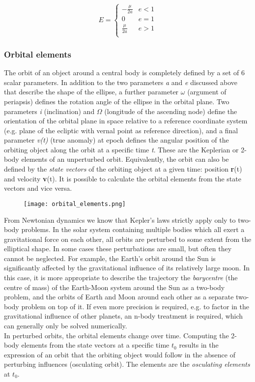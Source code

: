 \documentclass[Orbiter User Manual.tex]{subfiles}
\begin{document}
\[ E =
\left\{
\begin{array}{ll}
	-\frac{\mu}{2a} & e < 1 \\
	0 & e = 1 \\
	\frac{\mu}{2a} & e > 1 \\
\end{array} 
\right. \]

\subsubsection{Orbital elements}
The orbit of an object around a central body is completely defined by a set of 6 scalar parameters. In addition to the two parameters \textit{a} and \textit{e} discussed above that describe the shape of the ellipse, a further parameter $\omega$ (argument of periapsis) defines the rotation angle of the ellipse in the orbital plane. Two parameters \textit{i} (inclination) and $\Omega$ (longitude of the ascending node) define the orientation of the orbital plane in space relative to a reference coordinate system (e.g. plane of the ecliptic with vernal point {\Aries} as reference direction), and a final parameter \textit{v(t)} (true anomaly) at epoch defines the angular position of the orbiting object along the orbit at a specific time \textit{t}. These are the Keplerian or 2-body elements of an unperturbed orbit. Equivalently, the orbit can also be defined by the \textit{state vectors} of the orbiting object at a given time: position \textbf{r}(t) and velocity \textbf{v}(t). It is possible to calculate the orbital elements from the state vectors and vice versa.

\begin{figure}[H]
	\centering
	\texttt{[image: orbital\_elements.png]}
\end{figure}

\noindent
From Newtonian dynamics we know that Kepler’s laws strictly apply only to two-body problems. In the solar system containing multiple bodies which all exert a gravitational force on each other, all orbits are perturbed to some extent from the elliptical shape. In some cases these perturbations are small, but often they cannot be neglected. For example, the Earth’s orbit around the Sun is significantly affected by the gravitational influence of its relatively large moon. In this case, it is more appropriate to describe the trajectory the \textit{barycentre} (the centre of mass) of the Earth-Moon system around the Sun as a two-body problem, and the orbits of Earth and Moon around each other as a separate two-body problem on top of it. If even more precision is required, e.g. to factor in the gravitational influence of other planets, an n-body treatment is required, which can generally only be solved numerically.\\
In perturbed orbits, the orbital elements change over time. Computing the 2-body elements from the state vectors at a specific time $t_{0}$ results in the expression of an orbit that the orbiting object would follow in the absence of perturbing influences (osculating orbit). The elements are the \textit{osculating elements} at $t_{0}$.
\end{document}

